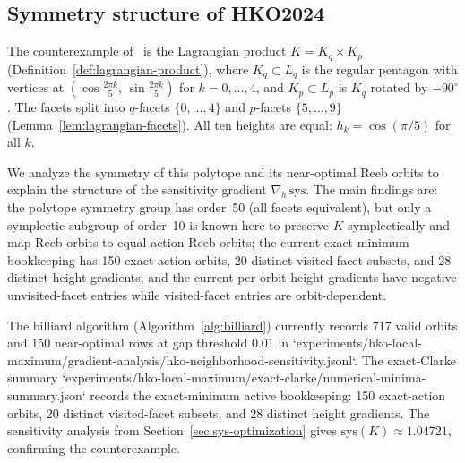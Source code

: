 %
%
%

\subsection{Symmetry structure of HKO2024}
\label{sec:hko-symmetry}

The counterexample of~\cite{HaimKislevOstrover2024} is the Lagrangian product
$K = K_q \times K_p$ (Definition~\ref{def:lagrangian-product}),
where $K_q \subset L_q$ is the regular pentagon with vertices at
$(\cos\tfrac{2\pi k}{5},\, \sin\tfrac{2\pi k}{5})$ for $k = 0, \ldots, 4$,
and $K_p \subset L_p$ is $K_q$ rotated by $-90^\circ$.
The facets split into $q$-facets $\{0, \ldots, 4\}$ and
$p$-facets $\{5, \ldots, 9\}$
(Lemma~\ref{lem:lagrangian-facets}).
All ten heights are equal:
$h_k = \cos(\pi/5)$ for all $k$.

We analyze the symmetry of this polytope and its near-optimal
Reeb orbits to explain the structure of the sensitivity gradient
$\nabla_h\,\mathrm{sys}$.
The main findings are:
the polytope symmetry group has order~50 (all facets equivalent),
but only a symplectic subgroup of order~10 is known here to preserve $K$
symplectically and map Reeb orbits to equal-action Reeb orbits;
the current exact-minimum bookkeeping has 150 exact-action orbits,
20 distinct visited-facet subsets, and 28 distinct height gradients;
and the current per-orbit height gradients have negative unvisited-facet
entries while visited-facet entries are orbit-dependent.

The billiard algorithm
(Algorithm~\ref{alg:billiard}) currently records 717 valid orbits and
150 near-optimal rows at gap threshold $0.01$ in
`experiments/hko-local-maximum/gradient-analysis/hko-neighborhood-sensitivity.jsonl`.
The exact-Clarke summary
`experiments/hko-local-maximum/exact-clarke/numerical-minima-summary.json`
records the exact-minimum active bookkeeping: 150 exact-action orbits,
20 distinct visited-facet subsets, and 28 distinct height gradients.
The sensitivity analysis from
Section~\ref{sec:sys-optimization} gives
$\mathrm{sys}(K) \approx 1.04721$, confirming the
counterexample.

